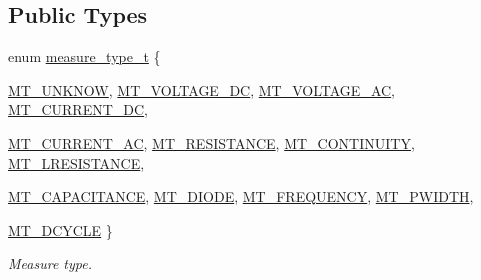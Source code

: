 \subsection*{Public Types}
\begin{DoxyCompactItemize}
\item 
enum \hyperlink{classmdt_frame_codec_scpi_u3606_a_a3d7a1de14d77797a08e3d2991fa9f004}{measure\_\-type\_\-t} \{ \par
\hyperlink{classmdt_frame_codec_scpi_u3606_a_a3d7a1de14d77797a08e3d2991fa9f004a56df4ffec0205d0bae97d56853490eec}{MT\_\-UNKNOW}, 
\hyperlink{classmdt_frame_codec_scpi_u3606_a_a3d7a1de14d77797a08e3d2991fa9f004a7178fed206da47e7f55e68723acf809a}{MT\_\-VOLTAGE\_\-DC}, 
\hyperlink{classmdt_frame_codec_scpi_u3606_a_a3d7a1de14d77797a08e3d2991fa9f004a95fc88c0223637cf3fe3a101fb568f1d}{MT\_\-VOLTAGE\_\-AC}, 
\hyperlink{classmdt_frame_codec_scpi_u3606_a_a3d7a1de14d77797a08e3d2991fa9f004a4b6d05bccb61870ebae4f58c34b41e31}{MT\_\-CURRENT\_\-DC}, 
\par
\hyperlink{classmdt_frame_codec_scpi_u3606_a_a3d7a1de14d77797a08e3d2991fa9f004acecbad4db2f3cb2b92099e2a0f57d3a3}{MT\_\-CURRENT\_\-AC}, 
\hyperlink{classmdt_frame_codec_scpi_u3606_a_a3d7a1de14d77797a08e3d2991fa9f004a9f886d13675400efc4d00779fd2ab078}{MT\_\-RESISTANCE}, 
\hyperlink{classmdt_frame_codec_scpi_u3606_a_a3d7a1de14d77797a08e3d2991fa9f004aa15b33c7ad4d6376e8ac717f089e6709}{MT\_\-CONTINUITY}, 
\hyperlink{classmdt_frame_codec_scpi_u3606_a_a3d7a1de14d77797a08e3d2991fa9f004afebd5198a9bae74385930f7643aff19e}{MT\_\-LRESISTANCE}, 
\par
\hyperlink{classmdt_frame_codec_scpi_u3606_a_a3d7a1de14d77797a08e3d2991fa9f004ad9fe01b60c051fa7b14201245bad8601}{MT\_\-CAPACITANCE}, 
\hyperlink{classmdt_frame_codec_scpi_u3606_a_a3d7a1de14d77797a08e3d2991fa9f004ab4a2afaa594cf44cbac880312d3e8c9f}{MT\_\-DIODE}, 
\hyperlink{classmdt_frame_codec_scpi_u3606_a_a3d7a1de14d77797a08e3d2991fa9f004af5887b3493507cf6c4fed5b140eddca4}{MT\_\-FREQUENCY}, 
\hyperlink{classmdt_frame_codec_scpi_u3606_a_a3d7a1de14d77797a08e3d2991fa9f004a37bfcf0b9e141ca60909e9b4a8c05997}{MT\_\-PWIDTH}, 
\par
\hyperlink{classmdt_frame_codec_scpi_u3606_a_a3d7a1de14d77797a08e3d2991fa9f004ae20a6a2d18ef077b65d9060e98ae3b12}{MT\_\-DCYCLE}
 \}
\begin{DoxyCompactList}\small\item\em Measure type. \end{DoxyCompactList}\end{DoxyCompactItemize}

